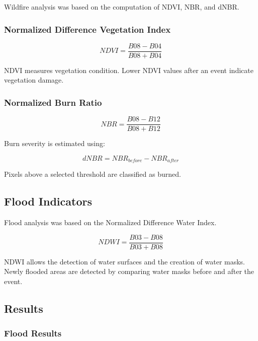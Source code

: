 \documentclass[11pt,a4paper]{article}
\begin{document}
Wildfire analysis was based on the computation of NDVI, NBR, and dNBR.

\subsubsection{Normalized Difference Vegetation Index}

\begin{equation}
NDVI = \frac{B08 - B04}{B08 + B04}
\end{equation}

NDVI measures vegetation condition. Lower NDVI values after an event indicate vegetation damage.

\subsubsection{Normalized Burn Ratio}

\begin{equation}
NBR = \frac{B08 - B12}{B08 + B12}
\end{equation}

Burn severity is estimated using:

\begin{equation}
dNBR = NBR_{before} - NBR_{after}
\end{equation}

Pixels above a selected threshold are classified as burned.

\subsection{Flood Indicators}

Flood analysis was based on the Normalized Difference Water Index.

\begin{equation}
NDWI = \frac{B03 - B08}{B03 + B08}
\end{equation}

NDWI allows the detection of water surfaces and the creation of water masks. Newly flooded areas are detected by comparing water masks before and after the event.

\subsection{Results}

\subsubsection{Flood Results}
\end{document}
